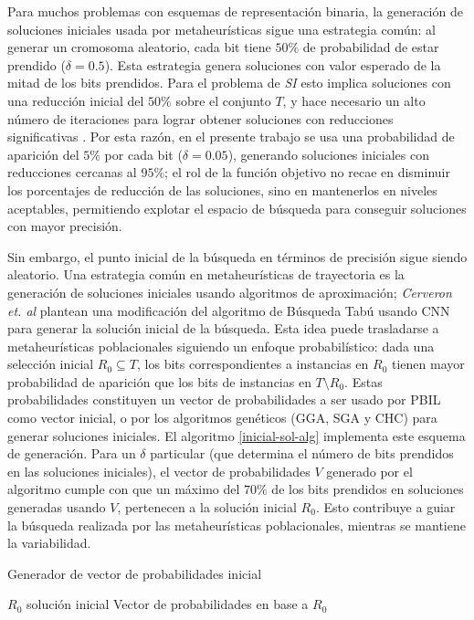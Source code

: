 Para muchos problemas con esquemas de representación binaria, la generación de soluciones iniciales usada por metaheurísticas sigue una estrategia común: al generar un cromosoma aleatorio, cada bit tiene $50\%$ de probabilidad de estar prendido ($\delta = 0.5$). Esta estrategia genera soluciones con valor esperado de la mitad de los bits prendidos. Para el problema de \emph{SI} esto implica soluciones con una reducción inicial del $50\%$ sobre el conjunto $T$, y hace necesario un alto número de iteraciones para lograr obtener soluciones con reducciones significativas \cite{cano2003using}. Por esta razón, en el presente trabajo se usa una probabilidad de aparición del $5\%$ por cada bit ($\delta = 0.05$), generando soluciones iniciales con reducciones cercanas al $95\%$; el rol de la función objetivo no recae en disminuir los porcentajes de reducción de las soluciones, sino en mantenerlos en niveles aceptables, permitiendo explotar el espacio de búsqueda para conseguir soluciones con mayor precisión.

Sin embargo, el punto inicial de la búsqueda en términos de precisión sigue siendo aleatorio. Una estrategia común en metaheurísticas de trayectoria es la generación de soluciones iniciales usando algoritmos de aproximación; \emph{Cerveron et. al} \cite{cerveron2001another} plantean una modificación del algoritmo de Búsqueda Tabú usando CNN para generar la solución inicial de la búsqueda. Esta idea puede trasladarse a metaheurísticas poblacionales siguiendo un enfoque probabilístico: dada una selección inicial $R_0 \subseteq T$, los bits correspondientes a instancias en $R_0$ tienen mayor probabilidad de aparición que los bits de instancias en $T \setminus R_0$. Estas probabilidades constituyen un vector de probabilidades a ser usado por PBIL como vector inicial, o por los algoritmos genéticos (GGA, SGA y CHC) para generar soluciones iniciales. El algoritmo \ref{inicial-sol-alg} implementa este esquema de generación. Para un $\delta$ particular (que determina el número de bits prendidos en las soluciones iniciales), el vector de probabilidades $V$ generado por el algoritmo cumple con que un máximo del $70\%$ de los bits prendidos en soluciones generadas usando $V$, pertenecen a la solución inicial $R_0$. Esto contribuye a guiar la búsqueda realizada por las metaheurísticas poblacionales, mientras se mantiene la variabilidad.

\begin{algorithm}
\caption{Generador de vector de probabilidades inicial}
\label{inicial-sol-alg}
\begin{algorithmic}[1]

\Require $R_0$ solución inicial
\Ensure Vector de probabilidades en base a $R_0$

	\Else
	\EndIf
\EndFor
\State {}
\end{algorithmic}
\end{algorithm}

